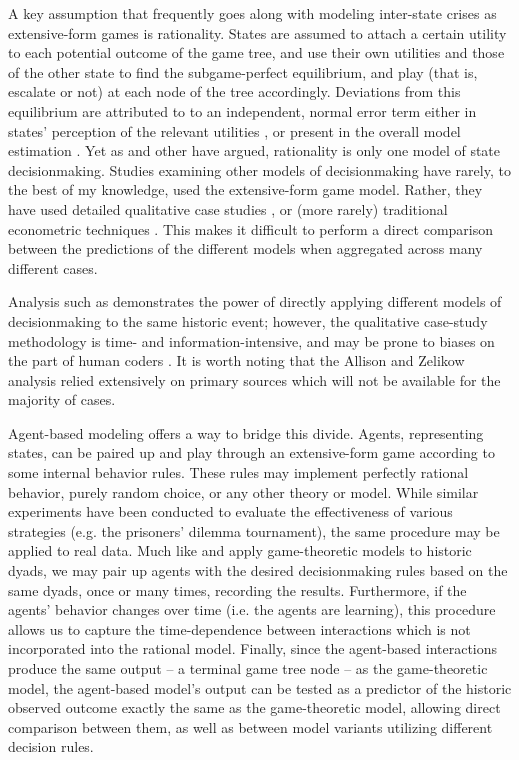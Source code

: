 A key assumption that frequently goes along with modeling inter-state crises as extensive-form games is rationality. States are assumed to attach a certain utility to each potential outcome of the game tree, and use their own utilities and those of the other state to find the subgame-perfect equilibrium, and play (that is, escalate or not) at each node of the tree accordingly. Deviations from this equilibrium are attributed to to an independent, normal error term either in states' perception of the relevant utilities \citep{signorino_1999}, or present in the overall model estimation \citep{smith_1999,bennett_2000}. Yet as \citet{allison_1999} and other have argued, rationality is only one model of state decisionmaking. Studies examining other models of decisionmaking have rarely, to the best of my knowledge, used the extensive-form game model. Rather, they have used detailed qualitative case studies \citep{achen_1989}, or (more rarely) traditional econometric techniques \citep{}. This makes it difficult to perform a direct comparison between the predictions of the different models when aggregated across many different cases.

Analysis such as \citet{allison_1999} demonstrates the power of directly applying different models of decisionmaking to the same historic event; however, the qualitative case-study methodology is time- and information-intensive, and may be prone to biases on the part of human coders \citep{}. It is worth noting that the Allison and Zelikow analysis relied extensively on primary sources which will not be available for the majority of cases.

Agent-based modeling offers a way to bridge this divide. Agents, representing states, can be paired up and play through an extensive-form game according to some internal behavior rules. These rules may implement perfectly rational behavior, purely random choice, or any other theory or model. While similar experiments have been conducted to evaluate the effectiveness of various strategies (e.g. the \citet{axelrod_1980} prisoners' dilemma tournament), the same procedure may be applied to real data. Much like \citet{bdm_1992} and \citet{bennett_2000} apply game-theoretic models to historic dyads, we may pair up agents with the desired decisionmaking rules based on the same dyads, once or many times, recording the results. Furthermore, if the agents' behavior changes over time (i.e. the agents are learning), this procedure allows us to capture the time-dependence between interactions which is not incorporated into the rational model. Finally, since the agent-based interactions produce the same output -- a terminal game tree node -- as the game-theoretic model, the agent-based model's output can be tested as a predictor of the historic observed outcome exactly the same as the game-theoretic model, allowing direct comparison between them, as well as between model variants utilizing different decision rules.

